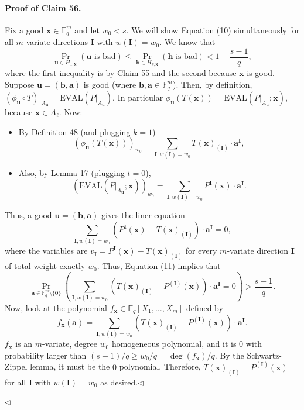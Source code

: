 \paragraph{Proof of Claim 56.} Fix a good $\boldsymbol x\in\mathbb F_q^m$ and let $w_0<s$. We will show Equation (10) simultaneously for all $m$-variate directions $\boldsymbol I$ with $w(\boldsymbol I)=w_0$. We know that
\[\Pr_{\boldsymbol u\in H_{1,\boldsymbol x}}(\boldsymbol u\text{ is bad})\leq\Pr_{\boldsymbol h\in H_{k,\boldsymbol x}}(\boldsymbol h\text{ is bad})<1-\frac{s-1}q,\tag{11}\]
where the first inequality is by Claim 55 and the second because $\boldsymbol x$ is good.
Suppose $\boldsymbol u=(\boldsymbol b,\boldsymbol a)$ is good (where $\boldsymbol b,\boldsymbol a\in\mathbb F_q^m$). Then, by definition, $(\phi_{\boldsymbol u}\circ T)|_{A_{\boldsymbol u}}=\mathrm{EVAL}(P|_{A_{\boldsymbol u}})$. In particular $\phi_{\boldsymbol u}(T(\boldsymbol x))=\mathrm{EVAL}(P|_{A_{\boldsymbol u}};\boldsymbol x)$, because $\boldsymbol x\in A_\ell$. Now:
\begin{itemize}
\item By Definition 48 (and plugging $k=1$)
\[(\phi_{\boldsymbol u}(T(\boldsymbol x)))_{w_0}=\sum_{\boldsymbol I,w(\boldsymbol I)=w_0}T(\boldsymbol x)_{(\boldsymbol I)}\cdot\boldsymbol a^{\boldsymbol I},\]
\item Also, by Lemma 17 (plugging $t=0$),
\[(\mathrm{EVAL}(P|_{A_{\boldsymbol u}};\boldsymbol x))_{w_0}=\sum_{\boldsymbol I,w(\boldsymbol I)=w_0}P^{\boldsymbol I}(\boldsymbol x)\cdot\boldsymbol a^{\boldsymbol I}.\]
\end{itemize}
Thus, a good $\boldsymbol u=(\boldsymbol b,\boldsymbol a)$ gives the liner equation
\[\sum_{\boldsymbol I,w(\boldsymbol I)=w_0}(P^{\boldsymbol I}(\boldsymbol x)-T(\boldsymbol x)_{(\boldsymbol I)})\cdot\boldsymbol a^{\boldsymbol I}=0,\]
where the variables are $v_{\boldsymbol I}=P^{\boldsymbol I}(\boldsymbol x)-T(\boldsymbol x)_{(\boldsymbol I)}$ for every $m$-variate direction $\boldsymbol I$ of total weight exactly $w_0$. Thus, Equation (11) implies that
\[\Pr_{\boldsymbol a\in\mathbb F_q^m\setminus\{\boldsymbol0\}}\left(\sum_{\boldsymbol I,w(\boldsymbol I)=w_0}(T(\boldsymbol x)_{(\boldsymbol I)}-P^{(\boldsymbol I)}(\boldsymbol x))\cdot\boldsymbol a^{\boldsymbol I}=0\right)>\frac{s-1}q.\]
Now, look at the polynomial $f_{\boldsymbol x}\in\mathbb F_q[X_1,\ldots,X_m]$ defined by
\[f_{\boldsymbol x}(\boldsymbol a)=\sum_{\boldsymbol I,w(\boldsymbol I)=w_0}(T(\boldsymbol x)_{(\boldsymbol I)}-P^{(\boldsymbol I)}(\boldsymbol x))\cdot\boldsymbol a^{\boldsymbol I}.\]
$f_{\boldsymbol x}$ is an $m$-variate, degree $w_0$ homogeneous polynomial, and it is $0$ with probability larger than $(s-1)/q\geq w_0/q=\deg(f_{\boldsymbol x})/q$. By the Schwartz-Zippel lemma, it must be the $0$ polynomial. Therefore, $T(\boldsymbol x)_{(\boldsymbol I)}-P^{(\boldsymbol I)}(\boldsymbol x)$ for all $\boldsymbol I$ with $w(\boldsymbol I)=w_0$ as desired.\hfill$\triangleleft$\par\hfill$\triangleleft$
